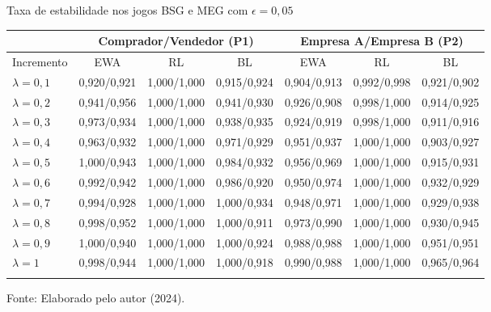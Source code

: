 \begin{tabela}[H]
	\small
	\centering
	\caption{Taxa de estabilidade nos jogos BSG e MEG com $\epsilon = 0,05$}
	\begin{tabular}{l|c c c|c c c}
		\Xhline{2\arrayrulewidth}
		& \multicolumn{3}{c|}{Comprador/Vendedor (P1)} & \multicolumn{3}{c}{Empresa A/Empresa B (P2)} \\ 
		\hline
		Incremento & EWA & RL & BL & EWA & RL & BL \\ \hline
		$\lambda = 0,1$ & 0,920/0,921 & 1,000/1,000 & 0,915/0,924 & 0,904/0,913 & 0,992/0,998 & 0,921/0,902 \\
		$\lambda = 0,2$ & 0,941/0,956 & 1,000/1,000 & 0,941/0,930 & 0,926/0,908 & 0,998/1,000 & 0,914/0,925 \\
		$\lambda = 0,3$ & 0,973/0,934 & 1,000/1,000 & 0,938/0,935 & 0,924/0,919 & 0,998/1,000 & 0,911/0,916 \\
		$\lambda = 0,4$ & 0,963/0,932 & 1,000/1,000 & 0,971/0,929 & 0,951/0,937 & 1,000/1,000 & 0,903/0,927 \\
		$\lambda = 0,5$ & 1,000/0,943 & 1,000/1,000 & 0,984/0,932 & 0,956/0,969 & 1,000/1,000 & 0,915/0,931 \\
		$\lambda = 0,6$ & 0,992/0,942 & 1,000/1,000 & 0,986/0,920 & 0,950/0,974 & 1,000/1,000 & 0,932/0,929 \\
		$\lambda = 0,7$ & 0,994/0,928 & 1,000/1,000 & 1,000/0,934 & 0,948/0,971 & 1,000/1,000 & 0,929/0,938 \\
		$\lambda = 0,8$ & 0,998/0,952 & 1,000/1,000 & 1,000/0,911 & 0,973/0,990 & 1,000/1,000 & 0,930/0,945 \\
		$\lambda = 0,9$ & 1,000/0,940 & 1,000/1,000 & 1,000/0,924 & 0,988/0,988 & 1,000/1,000 & 0,951/0,951 \\
		$\lambda = 1$ & 0,998/0,944 & 1,000/1,000 & 1,000/0,918 & 0,990/0,988 & 1,000/1,000 & 0,965/0,964 \\
		\Xhline{2\arrayrulewidth}
	\end{tabular}
	\label{tabela_14}
	\caption*{\fontsize{10}{12}\selectfont Fonte: Elaborado pelo autor (2024).}
\end{tabela}
